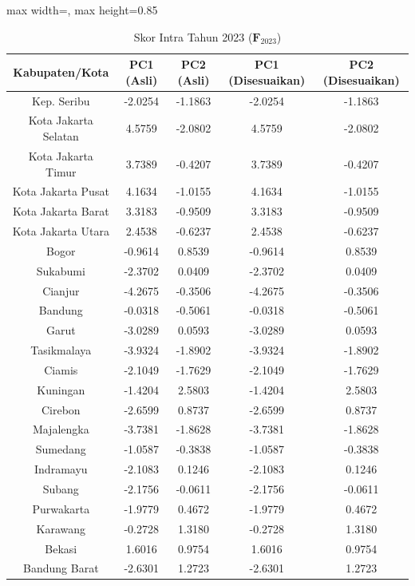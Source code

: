 \begin{table}[H]
\centering
\caption{Skor Intra Tahun 2023 ($\mathbf{F}_{2023}$)} \label{tab:app1skor_intra_2023}
\begin{adjustbox}{max width=\textwidth, max height=0.85\textheight}
\begin{tabular}{|c|c|c|c|c|}
\hline
\textbf{Kabupaten/Kota} & \textbf{PC1 (Asli)} & \textbf{PC2 (Asli)} & \textbf{PC1 (Disesuaikan)} & \textbf{PC2 (Disesuaikan)} \\
\hline
Kep. Seribu & -2.0254 & -1.1863 & -2.0254 & -1.1863 \\
Kota Jakarta Selatan & 4.5759 & -2.0802 & 4.5759 & -2.0802 \\
Kota Jakarta Timur & 3.7389 & -0.4207 & 3.7389 & -0.4207 \\
Kota Jakarta Pusat & 4.1634 & -1.0155 & 4.1634 & -1.0155 \\
Kota Jakarta Barat & 3.3183 & -0.9509 & 3.3183 & -0.9509 \\
Kota Jakarta Utara & 2.4538 & -0.6237 & 2.4538 & -0.6237 \\
Bogor & -0.9614 & 0.8539 & -0.9614 & 0.8539 \\
Sukabumi & -2.3702 & 0.0409 & -2.3702 & 0.0409 \\
Cianjur & -4.2675 & -0.3506 & -4.2675 & -0.3506 \\
Bandung & -0.0318 & -0.5061 & -0.0318 & -0.5061 \\
Garut & -3.0289 & 0.0593 & -3.0289 & 0.0593 \\
Tasikmalaya & -3.9324 & -1.8902 & -3.9324 & -1.8902 \\
Ciamis & -2.1049 & -1.7629 & -2.1049 & -1.7629 \\
Kuningan & -1.4204 & 2.5803 & -1.4204 & 2.5803 \\
Cirebon & -2.6599 & 0.8737 & -2.6599 & 0.8737 \\
Majalengka & -3.7381 & -1.8628 & -3.7381 & -1.8628 \\
Sumedang & -1.0587 & -0.3838 & -1.0587 & -0.3838 \\
Indramayu & -2.1083 & 0.1246 & -2.1083 & 0.1246 \\
Subang & -2.1756 & -0.0611 & -2.1756 & -0.0611 \\
Purwakarta & -1.9779 & 0.4672 & -1.9779 & 0.4672 \\
Karawang & -0.2728 & 1.3180 & -0.2728 & 1.3180 \\
Bekasi & 1.6016 & 0.9754 & 1.6016 & 0.9754 \\
Bandung Barat & -2.6301 & 1.2723 & -2.6301 & 1.2723 \\

\end{tabular}
\end{adjustbox}
\end{table}
